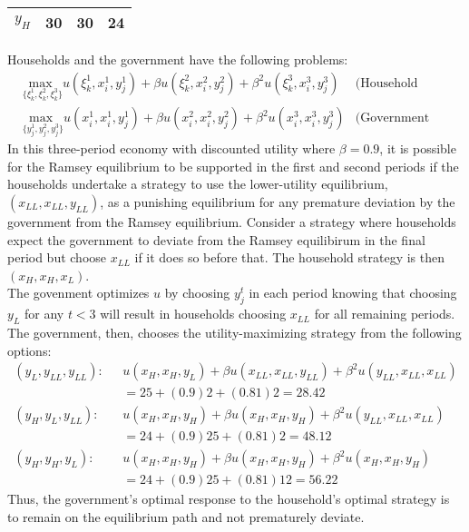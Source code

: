 \documentclass{article}
\newcommand{\usmax}[1]{\underset{\{#1\}}{\text{max }}}
\begin{document}
\begin{enumerate}
\begin{center}
\begin{tabular}{|c|c|c|c|}
			$y_H$		& 30  	 & 30 	 & 24	\\ \hline
			\end{tabular}
		\end{center}
		Households and the government have the following problems:
		\begin{align*}
			&\usmax{\xi_k^1,\xi_k^2,\xi_k^3}u(\xi_k^1,x_i^1,y_j^1) + \beta u(\xi_k^2,x_i^2,y_j^2) + \beta^2u(\xi_k^3,x_i^3,y_j^3) 	&\text{(Household Problem)}	\\
			&\usmax{y_j^1,y_j^2,y_j^3}u(x_i^1,x_i^1,y_j^1) + \beta u(x_i^2,x_i^2,y_j^2) + \beta^2u(x_i^3,x_i^3,y_j^3) 				&\text{(Government Problem)}
		\end{align*}
		In this three-period economy with discounted utility where $\beta=0.9$, it is possible for the Ramsey equilibrium to be supported in the first and second periods if the households undertake a strategy to use the lower-utility equilibrium, $(x_{LL},x_{LL},y_{LL})$, as a punishing equilibrium for any premature deviation by the government from the Ramsey equilibrium. Consider a strategy where households expect the government to deviate from the Ramsey equilibirum in the final period but choose $x_{LL}$ if it does so before that. The household strategy is then $(x_H,x_H,x_L)$. 
		\medskip \\
		The govenment optimizes $u$ by choosing $y_j^t$ in each period knowing that choosing $y_L$ for any $t<3$ will result in households choosing $x_{LL}$ for all remaining periods. The government, then, chooses the utility-maximizing strategy from the following options:
		\begin{align*}
			(y_L,y_{LL},y_{LL}):\text{ }& u(x_H,x_H,y_L) + \beta u(x_{LL},x_{LL},y_{LL}) + \beta^2 u(y_{LL},x_{LL},x_{LL}) \\
										& = 25 + (0.9)2 + (0.81)2 	= 28.42	\\
			(y_H,y_L,y_{LL}):\text{ }	& u(x_H,x_H,y_H) + \beta u(x_H,x_H,y_H) + \beta^2 u(y_{LL},x_{LL},x_{LL}) 	 \\
										& = 24 + (0.9)25 + (0.81)2 	= 48.12 \\
			(y_H,y_H,y_L):\text{ }		& u(x_H,x_H,y_H) + \beta u(x_H,x_H,y_H) + \beta^2 u(x_H,x_H,y_H) 		 \\
										& = 24 + (0.9)25 + (0.81)12	= 56.22
		\end{align*}
		Thus, the government's optimal response to the household's optimal strategy is to remain on the equilibrium path and not prematurely deviate.
\end{enumerate}
\end{document}
